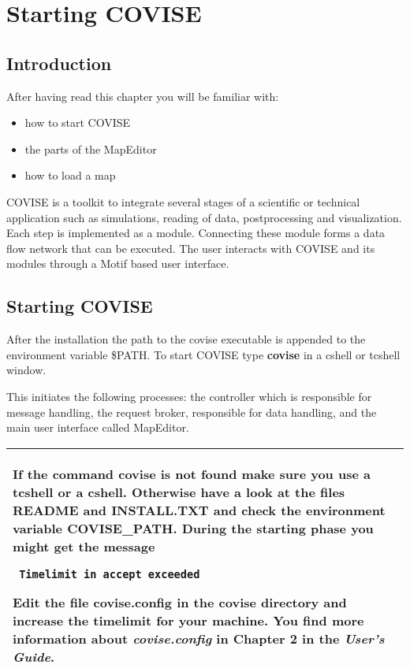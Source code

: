 
\begin{htmlonly}

\end{htmlonly}


\startdocument
\chapter{Starting COVISE}
\label{StartCOVISE}

\section{Introduction}

After having read this chapter you will be familiar with: 

\begin{itemize}
\item how to start COVISE 
\item the parts of the MapEditor 
\item how to load a map
\end{itemize}

COVISE is a toolkit to integrate several stages of a scientific or technical 
application such as simulations, reading of data, postprocessing and visualization. 
Each step is implemented as a module. Connecting these module forms a data flow 
network that can be executed. The user interacts with COVISE and its modules 
through a Motif based user interface.

\section{Starting COVISE}

After the installation the path to the covise executable is appended to the 
environment variable \$PATH. To start COVISE type {\bf covise} in a cshell or 
tcshell window. 

This initiates the following processes: the controller which is responsible 
for message handling, the request broker, responsible for data handling, and 
the main user interface called MapEditor.


\begin{longtable}{|p{15cm}|}
\hline
If the command {\bf covise} is not found make sure you use a tcshell or a cshell.
Otherwise have a look at the files README and INSTALL.TXT and check the environment
variable COVISE\_PATH. \newline
During the starting phase you might get the message \begin{verbatim} Timelimit in accept exceeded
\end{verbatim}
Edit the file covise.config in the covise directory and increase the timelimit 
for your machine. You find more information about {\it covise.config} in Chapter 2 in 
the {\it User's Guide}.\\	 														
\hline
\end{longtable}


